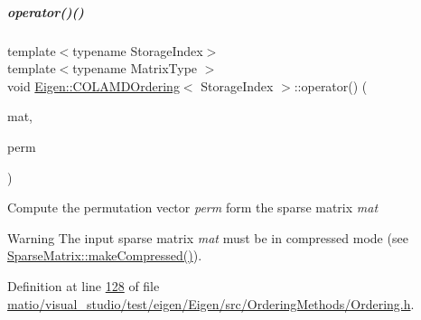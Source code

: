 \mbox{\label{group___ordering_methods___module_a708cb20191dcd79856d922f262405946}} 
\subparagraph{\texorpdfstring{operator()()}{operator()()}\hspace{0.1cm}{\footnotesize\ttfamily [2/2]}}
{\footnotesize\ttfamily template$<$typename Storage\+Index$>$ \\
template$<$typename Matrix\+Type $>$ \\
void \hyperlink{group___ordering_methods___module_class_eigen_1_1_c_o_l_a_m_d_ordering}{Eigen\+::\+C\+O\+L\+A\+M\+D\+Ordering}$<$ Storage\+Index $>$\+::operator() (\begin{DoxyParamCaption}\item[{const Matrix\+Type \&}]{mat,  }\item[{\hyperlink{group___core___module}{Permutation\+Type} \&}]{perm }\end{DoxyParamCaption})\hspace{0.3cm}{\ttfamily [inline]}}

Compute the permutation vector {\itshape perm} form the sparse matrix {\itshape mat} \begin{DoxyWarning}{Warning}
The input sparse matrix {\itshape mat} must be in compressed mode (see \hyperlink{group___sparse_core___module_a5ff54ffc10296f9466dc81fa888733fd}{Sparse\+Matrix\+::make\+Compressed()}). 
\end{DoxyWarning}


Definition at line \hyperlink{matio_2visual__studio_2test_2eigen_2_eigen_2src_2_ordering_methods_2_ordering_8h_source_l00128}{128} of file \hyperlink{matio_2visual__studio_2test_2eigen_2_eigen_2src_2_ordering_methods_2_ordering_8h_source}{matio/visual\+\_\+studio/test/eigen/\+Eigen/src/\+Ordering\+Methods/\+Ordering.\+h}.

